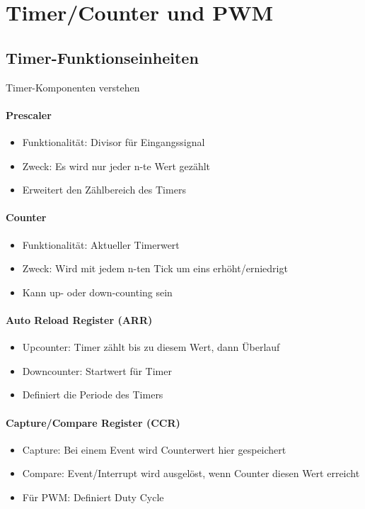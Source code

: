 \section{Timer/Counter und PWM}

\subsection{Timer-Funktionseinheiten}

\begin{KR}{Timer-Komponenten verstehen}\\
    \paragraph{Prescaler}
    \begin{itemize}
        \item Funktionalität: Divisor für Eingangssignal
        \item Zweck: Es wird nur jeder n-te Wert gezählt
        \item Erweitert den Zählbereich des Timers
    \end{itemize}
    
    \paragraph{Counter}
    \begin{itemize}
        \item Funktionalität: Aktueller Timerwert
        \item Zweck: Wird mit jedem n-ten Tick um eins erhöht/erniedrigt
        \item Kann up- oder down-counting sein
    \end{itemize}
    
    \paragraph{Auto Reload Register (ARR)}
    \begin{itemize}
        \item Upcounter: Timer zählt bis zu diesem Wert, dann Überlauf
        \item Downcounter: Startwert für Timer
        \item Definiert die Periode des Timers
    \end{itemize}
    
    \paragraph{Capture/Compare Register (CCR)}
    \begin{itemize}
        \item Capture: Bei einem Event wird Counterwert hier gespeichert
        \item Compare: Event/Interrupt wird ausgelöst, wenn Counter diesen Wert erreicht
        \item Für PWM: Definiert Duty Cycle
    \end{itemize}
\end{KR}

